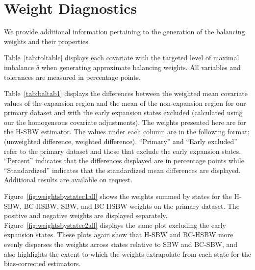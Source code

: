 \section{Weight Diagnostics}\label{app:weightdiagnostics}

We provide additional information pertaining to the generation of the balancing weights and their properties.

Table~\ref{tab:toltable} displays each covariate with the targeted level of maximal imbalance $\delta$ when generating approximate balancing weights. All variables and tolerances are measured in percentage points.

Table~\ref{tab:baltab1} displays the differences between the weighted mean covariate values of the expansion region and the mean of the non-expansion region for our primary dataset and with the early expansion states excluded (calculated using our the homogeneous covariate adjustments). The weights presented here are for the H-SBW estimator. The values under each column are in the following format: (unweighted difference, weighted difference). ``Primary'' and ``Early excluded'' refer to the primary dataset and those that exclude the early expansion states. ``Percent'' indicates that the differences displayed are in percentage points while ``Standardized'' indicates that the standardized mean differences are displayed. Additional results are available on request.

Figure~\ref{fig:weightsbystatec1all} shows the weights summed by states for the H-SBW, BC-HSBW, SBW, and BC-HSBW weights on the primary dataset. The positive and negative weights are displayed separately. Figure~\ref{fig:weightsbystatec2all} displays the same plot excluding the early expansion states. These plots again show that H-SBW and BC-HSBW more evenly disperses the weights across states relative to SBW and BC-SBW, and also highlights the extent to which the weights extrapolate from each state for the bias-corrected estimators.

